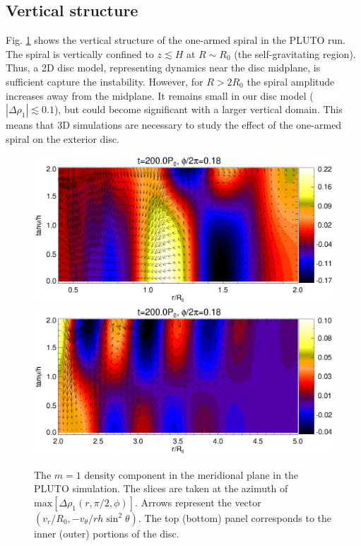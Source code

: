 \subsection{Vertical structure}
Fig. \ref{3d_rz} shows the vertical structure of the one-armed 
spiral in the PLUTO run. The spiral is vertically confined to $z
\lesssim H$ at $R\sim R_0$ (the self-gravitating region). Thus, a 2D
disc model, representing dynamics near the disc midplane, is  
sufficient capture the instability. However, for $R>2R_0$ the spiral amplitude
increases away from the midplane. It remains  
small in our disc model ($|\Delta\rho_1| \lesssim 0.1$), but could become 
significant with a larger vertical domain. This means that 3D 
simulations are necessary to study the effect of the one-armed spiral
on the exterior disc.  
   
\begin{figure}
  \includegraphics[scale=0.47,clip=true,trim=0cm 0.79cm 0cm
  0cm]{figures/pdisk_rz_023_sg}  
  \includegraphics[scale=0.47,clip=true,trim=0cm 0cm 0cm
  0.64cm]{figures/pdisk_rz_023_nsg}  
  \caption{The $m=1$ density component in the meridional plane in the 
    PLUTO simulation. The slices are taken at the azimuth of   
    $\mathrm{max}[\Delta\rho_1(r,\pi/2,\phi)]$. Arrows represent the vector 
    $(v_r/R_0,-v_\theta/rh\sin^2{\theta})$. The top (bottom) panel corresponds
    to the inner (outer) portions of the disc. 
    \label{3d_rz}} 
\end{figure}   

